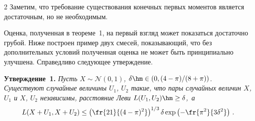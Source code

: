 \begin{multicols}{2}
Заметим, что требование существования конечных первых моментов
является достаточным, но не необходимым.

Оценка, полученная в теореме~1, на первый взгляд
может показаться достаточно грубой.  Ниже построен пример двух
смесей, показывающий, что без дополнительных условий полученная
оценка не может быть принципиально улучшена. Справедливо следующее
утверждение.

\medskip

\noindent
\textbf{Утверждение~1.}
\textit{Пусть $X\sim\mathcal{N}(0,1)$, $\delta \hm\in (0,({4 - \pi})/({8 + \pi}))$.
Существуют случайные величины $U_1$, $U_2$ такие, что пары случайных
величин $X$, $U_1$ и $X$, $U_2$ независимы, расстояние Леви $L(U_1,
U_2)\hm\ge\delta$,~а}
$$
L(X+U_1, X+U_2)\le
\left(\fr{21 }{(4-\pi)^2}\right)^{1/3}
\delta \exp\left(- {\fr{\pi^2}{3\delta^2}}\right)
\,.
$$


\end{multicols}
